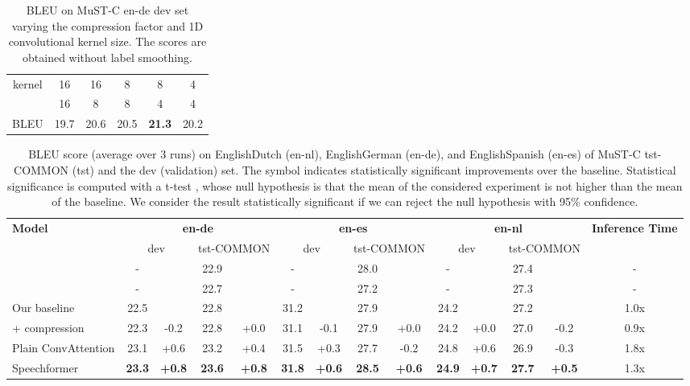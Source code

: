 \documentclass[11pt]{article}
\begin{document}
\begin{table}[tb]
\centering
\small
\begin{tabular}{c|ccccc}
 \hline
 kernel & 16 & 16 & 8 & 8 & 4\\
   & 16 & 8 & 8 & 4 & 4 \\
 \hline
 BLEU & 19.7 & 20.6 & 20.5 & \textbf{21.3} & 20.2 \\
\hline
\end{tabular}
\caption{BLEU on MuST-C en-de dev set varying the compression factor  and 1D convolutional kernel size. The scores are obtained without label smoothing.}
\label{tab:parameters}
\end{table}


\begin{table*}[t]
\setlength{\tabcolsep}{2.5pt}
\centering
\small
\begin{tabular}{l|cccc|cccc|cccc|c}
 \hline
 \textbf{Model} & 
\multicolumn{4}{c|}{\textbf{en-de}} &  
  \multicolumn{4}{c|}{\textbf{en-es}} & 
  \multicolumn{4}{c|}{\textbf{en-nl}} &
  \multirow{2}{1.4cm}{\textbf{Inference Time}}
 \\ & 
\multicolumn{2}{c}{dev} &  
  \multicolumn{2}{c|}{tst-COMMON} & 
  \multicolumn{2}{c}{dev} &  
  \multicolumn{2}{c|}{tst-COMMON} & 
  \multicolumn{2}{c}{dev} &  
  \multicolumn{2}{c|}{tst-COMMON}
 \\
 \hline
 \cite{inaguma-etal-2020-espnet} & - & & 22.9 & & - & & 28.0 & & - & & 27.4 & & - \\
 \cite{wang-etal-2020-fairseq} & - & & 22.7 & & - & & 27.2 & & - & & 27.3 & & - \\
 \hline
 Our baseline & 22.5 & & 22.8 & & 31.2 & & 27.9 & & 24.2 & & 27.2 &  & 1.0x \\
 \hspace{0.3cm} + compression & 22.3 & -0.2 & 22.8 & +0.0 & 31.1 & -0.1 & 27.9 & +0.0 & 24.2 & +0.0 & 27.0 & -0.2 & 0.9x \\
 \hline
 Plain ConvAttention & 23.1 & +0.6 & 23.2 & +0.4 & 31.5 & +0.3 & 27.7 & -0.2 & 24.8 & +0.6 & 26.9 & -0.3 & 1.8x \\
 Speechformer & \textbf{23.3} & \textbf{+0.8} & \textbf{23.6} & \textbf{+0.8} & \textbf{31.8} & \textbf{+0.6} &\textbf{28.5} & \textbf{+0.6} & \textbf{24.9} & \textbf{+0.7} & \textbf{27.7} & \textbf{+0.5} & 1.3x \\
 \hline
\end{tabular}
\caption{BLEU score (average over 3 runs) on EnglishDutch (en-nl), EnglishGerman (en-de), and EnglishSpanish (en-es) of MuST-C tst-COMMON (tst) and the dev (validation) set. The  symbol indicates statistically significant improvements over the baseline. Statistical significance is computed with a t-test \cite{10.2307/2331554}, 
whose null hypothesis is that the mean of the considered experiment is not higher than the mean of the baseline. We consider the result statistically significant if we can reject the null hypothesis with 95\% confidence.}
\label{tab:results}
\end{table*}
\end{document}
